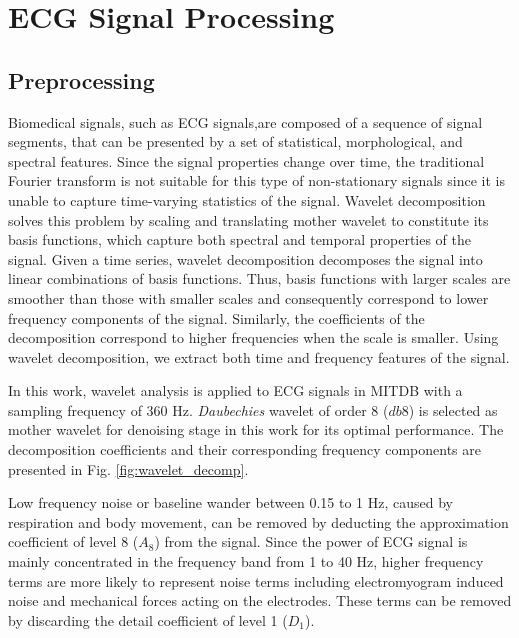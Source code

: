\section{ECG Signal Processing}\label{sec:ecgprocessing}

\subsection{Preprocessing}
Biomedical signals, such as ECG signals,are composed of a sequence of signal segments, that can be presented by a set of statistical, morphological, and spectral features. Since the signal properties change over time, the traditional Fourier transform is not suitable for this type of non-stationary signals since it is unable to capture time-varying statistics of the signal. Wavelet decomposition solves this problem by scaling and translating mother wavelet to constitute its basis functions, which capture both spectral and temporal properties of the signal. Given a time series, wavelet decomposition decomposes the signal into linear combinations of basis functions. Thus, basis functions with larger scales are smoother than those with smaller scales and consequently correspond to lower frequency components of the signal. Similarly, the coefficients of the decomposition correspond to higher frequencies when the scale is smaller. Using wavelet decomposition, we extract both time and frequency features of the signal.


In this work, wavelet analysis is applied to ECG signals in MITDB with a sampling frequency of 360 Hz. \textit{Daubechies} wavelet of order 8 ($db8$) is selected as mother wavelet for denoising stage in this work for its optimal performance\cite{denoise}. The decomposition coefficients and their corresponding frequency components are presented in Fig. \ref{fig:wavelet_decomp}. %

Low frequency noise or baseline wander between 0.15 to 1 Hz, caused by respiration and body movement, can be removed by deducting the approximation coefficient of level 8 ($A_8$) from the signal. Since the power of ECG signal is mainly concentrated in the frequency band from 1 to 40 Hz, higher frequency terms are more likely to represent noise terms including electromyogram induced noise and mechanical forces acting on the electrodes. These terms can be removed by discarding the detail coefficient of level 1 ($D_1$). 

